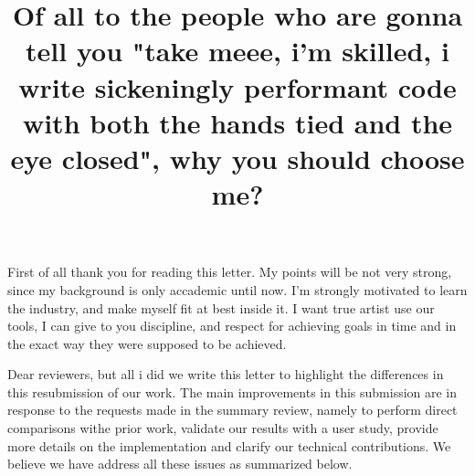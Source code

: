 \documentclass[acmlarge]{acmart}
\begin{document}
\title{Of all to the people who are gonna tell you "take meee, i'm skilled, i write sickeningly performant code with both the hands tied and the eye closed", why you should choose me?}
\maketitle

First of all thank you for reading this letter. 
My points will be not very strong, since my background is only accademic until now. I'm strongly motivated to learn the industry, and make myself fit at best inside it. I want true artist use our tools,  I can give to you discipline, and respect for achieving goals in time and in the exact way they were supposed to be achieved. 


Dear reviewers,
but all i did
we write this letter to highlight the differences in this resubmission of our work.
The main improvements in this submission are in response to the requests made 
in the summary review, namely to perform direct comparisons withe prior work,
validate our results with a user study, provide more details on the implementation and
clarify our technical contributions. 
We believe we have address all these issues as summarized below.
\end{document}
